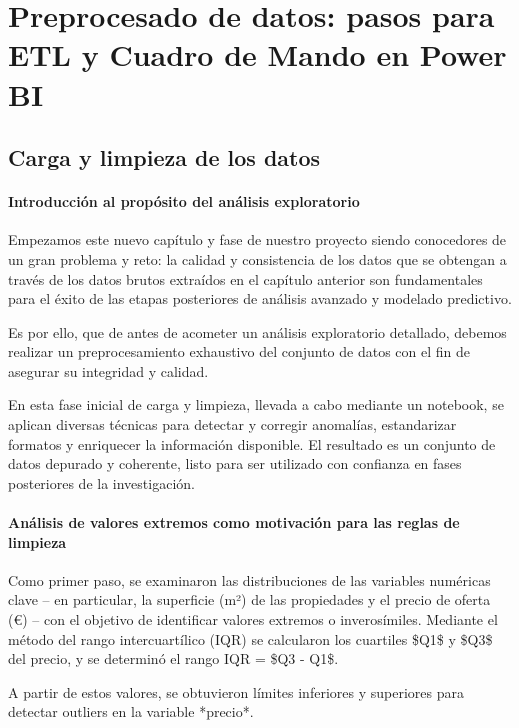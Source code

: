 \documentclass[a4paper,11pt]{book}
\begin{document}
\chapter{Preprocesado de datos: pasos para ETL y Cuadro de Mando en Power BI}
\section{Carga y limpieza de los datos}

\subsubsection{Introducción al propósito del análisis exploratorio}
Empezamos este nuevo capítulo y fase de nuestro proyecto siendo conocedores de un gran problema y reto: la calidad y consistencia de los datos que se obtengan a través de los datos brutos extraídos en el capítulo anterior son fundamentales para el éxito de las etapas posteriores de análisis avanzado y modelado predictivo. 

Es por ello, que de  antes de acometer un análisis exploratorio detallado, debemos realizar un preprocesamiento exhaustivo del conjunto de datos con el fin de asegurar su integridad y calidad. 

En esta fase inicial de carga y limpieza, llevada a cabo mediante un notebook, se aplican diversas técnicas para detectar y corregir anomalías, estandarizar formatos y enriquecer la información disponible. El resultado es un conjunto de datos depurado y coherente, listo para ser utilizado con confianza en fases posteriores de la investigación. 

\subsubsection{Análisis de valores extremos como motivación para las reglas de limpieza}
Como primer paso, se examinaron las distribuciones de las variables numéricas clave – en particular, la superficie (m²) de las propiedades y el precio de oferta (€) – con el objetivo de identificar valores extremos o inverosímiles. Mediante el método del rango intercuartílico (IQR) se calcularon los cuartiles \$Q1\$ y \$Q3\$ del precio, y se determinó el rango IQR = \$Q3 - Q1\$. 

A partir de estos valores, se obtuvieron límites inferiores y superiores para detectar outliers en la variable *precio*.  

\end{document}
